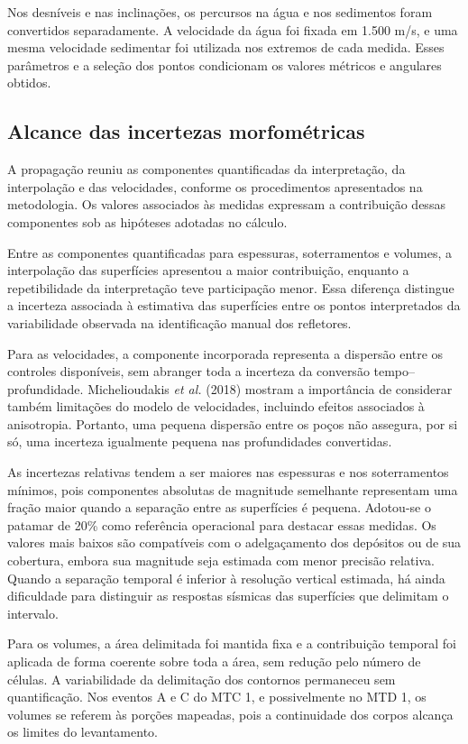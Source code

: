 Nos desníveis e nas inclinações, os percursos na água e nos sedimentos foram convertidos separadamente. A velocidade da água foi fixada em 1.500 m/s, e uma mesma velocidade sedimentar foi utilizada nos extremos de cada medida. Esses parâmetros e a seleção dos pontos condicionam os valores métricos e angulares obtidos.

\subsection{Alcance das incertezas morfométricas}\label{sec:6-10-3}

A propagação reuniu as componentes quantificadas da interpretação, da interpolação e das velocidades, conforme os procedimentos apresentados na metodologia. Os valores associados às medidas expressam a contribuição dessas componentes sob as hipóteses adotadas no cálculo.

Entre as componentes quantificadas para espessuras, soterramentos e volumes, a interpolação das superfícies apresentou a maior contribuição, enquanto a repetibilidade da interpretação teve participação menor. Essa diferença distingue a incerteza associada à estimativa das superfícies entre os pontos interpretados da variabilidade observada na identificação manual dos refletores.

Para as velocidades, a componente incorporada representa a dispersão entre os controles disponíveis, sem abranger toda a incerteza da conversão tempo--profundidade. Michelioudakis \textit{et al.} (2018) mostram a importância de considerar também limitações do modelo de velocidades, incluindo efeitos associados à anisotropia. Portanto, uma pequena dispersão entre os poços não assegura, por si só, uma incerteza igualmente pequena nas profundidades convertidas.

As incertezas relativas tendem a ser maiores nas espessuras e nos soterramentos mínimos, pois componentes absolutas de magnitude semelhante representam uma fração maior quando a separação entre as superfícies é pequena. Adotou-se o patamar de 20\% como referência operacional para destacar essas medidas. Os valores mais baixos são compatíveis com o adelgaçamento dos depósitos ou de sua cobertura, embora sua magnitude seja estimada com menor precisão relativa. Quando a separação temporal é inferior à resolução vertical estimada, há ainda dificuldade para distinguir as respostas sísmicas das superfícies que delimitam o intervalo.

Para os volumes, a área delimitada foi mantida fixa e a contribuição temporal foi aplicada de forma coerente sobre toda a área, sem redução pelo número de células. A variabilidade da delimitação dos contornos permaneceu sem quantificação. Nos eventos A e C do MTC 1, e possivelmente no MTD 1, os volumes se referem às porções mapeadas, pois a continuidade dos corpos alcança os limites do levantamento.


